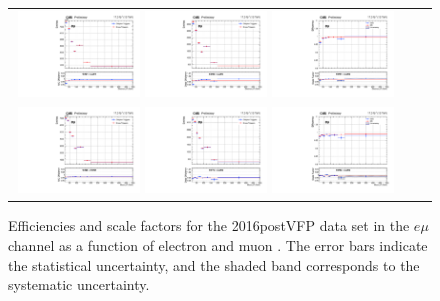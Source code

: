 \begin{figure}[h]
  \begin{center}
    \begin{tabular}{ccc}
      \includegraphics[width=0.32\textwidth]{fig_2016postVFP_TrigSF/g_lepApt_emu_MC.pdf}
      \includegraphics[width=0.32\textwidth]{fig_2016postVFP_TrigSF/g_lepApt_emu_data.pdf}
      \includegraphics[width=0.32\textwidth]{fig_2016postVFP_TrigSF/g_emu_lepApt_FullSystUncBand.pdf}\\
      \includegraphics[width=0.32\textwidth]{fig_2016postVFP_TrigSF/g_lepBpt_emu_MC.pdf}
      \includegraphics[width=0.32\textwidth]{fig_2016postVFP_TrigSF/g_lepBpt_emu_data.pdf}
      \includegraphics[width=0.32\textwidth]{fig_2016postVFP_TrigSF/g_emu_lepBpt_FullSystUncBand.pdf}\\
    \end{tabular}
    \caption{Efficiencies and scale factors for the 2016postVFP data set in the $e\mu$ channel as a function of electron and muon \pT.
            The error bars indicate the statistical uncertainty, and the shaded band corresponds to the systematic uncertainty.
            }
    \label{TrigSF_2016postVFP_1}
  \end{center}
\end{figure}

